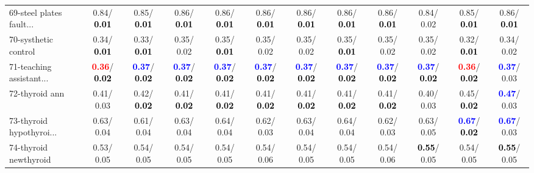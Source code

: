 \begin{table}[h]
\begin{center}
{\begin{tabular}{lc|c|c|c|c|c|c|c|c|c|c}
69-steel plates fault... &   0.84/\textcolor{black}{\textbf{  0.01}} &   0.85/\textcolor{black}{\textbf{  0.01}} &   0.86/\textcolor{black}{\textbf{  0.01}} &   0.86/\textcolor{black}{\textbf{  0.01}} &   0.86/\textcolor{black}{\textbf{  0.01}} &   0.86/\textcolor{black}{\textbf{  0.01}} &   0.86/\textcolor{black}{\textbf{  0.01}} &   0.86/\textcolor{black}{\textbf{  0.01}} &   0.84/  0.02 &   0.85/\textcolor{black}{\textbf{  0.01}} &   0.86/\textcolor{black}{\textbf{  0.01}} \\
70-systhetic control &   0.34/\textcolor{black}{\textbf{  0.01}} &   0.33/\textcolor{black}{\textbf{  0.01}} &   0.35/  0.02 &   0.35/\textcolor{black}{\textbf{  0.01}} &   0.35/  0.02 &   0.35/  0.02 &   0.35/\textcolor{black}{\textbf{  0.01}} &   0.35/  0.02 &   0.35/  0.02 &   0.32/\textcolor{black}{\textbf{  0.01}} &   0.34/  0.02 \\
71-teaching assistant... & \textcolor{red}{\textbf{  0.36}}/\textcolor{black}{\textbf{  0.02}} & \textcolor{blue}{\textbf{  0.37}}/\textcolor{black}{\textbf{  0.02}} & \textcolor{blue}{\textbf{  0.37}}/\textcolor{black}{\textbf{  0.02}} & \textcolor{blue}{\textbf{  0.37}}/\textcolor{black}{\textbf{  0.02}} & \textcolor{blue}{\textbf{  0.37}}/\textcolor{black}{\textbf{  0.02}} & \textcolor{blue}{\textbf{  0.37}}/\textcolor{black}{\textbf{  0.02}} & \textcolor{blue}{\textbf{  0.37}}/\textcolor{black}{\textbf{  0.02}} & \textcolor{blue}{\textbf{  0.37}}/\textcolor{black}{\textbf{  0.02}} & \textcolor{blue}{\textbf{  0.37}}/\textcolor{black}{\textbf{  0.02}} & \textcolor{red}{\textbf{  0.36}}/\textcolor{black}{\textbf{  0.02}} & \textcolor{blue}{\textbf{  0.37}}/  0.03 \\ \hline
72-thyroid ann &   0.41/  0.03 &   0.42/\textcolor{black}{\textbf{  0.02}} &   0.41/\textcolor{black}{\textbf{  0.02}} &   0.41/\textcolor{black}{\textbf{  0.02}} &   0.41/\textcolor{black}{\textbf{  0.02}} &   0.41/\textcolor{black}{\textbf{  0.02}} &   0.41/\textcolor{black}{\textbf{  0.02}} &   0.41/\textcolor{black}{\textbf{  0.02}} &   0.40/  0.03 &   0.45/\textcolor{black}{\textbf{  0.02}} & \textcolor{blue}{\textbf{  0.47}}/  0.03 \\
73-thyroid hypothyroi... &   0.63/  0.04 &   0.61/  0.04 &   0.63/  0.04 &   0.64/  0.04 &   0.62/  0.03 &   0.63/  0.04 &   0.64/  0.04 &   0.62/  0.03 &   0.63/  0.05 & \textcolor{blue}{\textbf{  0.67}}/\textcolor{black}{\textbf{  0.02}} & \textcolor{blue}{\textbf{  0.67}}/  0.03 \\
74-thyroid newthyroid &   0.53/  0.05 &   0.54/  0.05 &   0.54/  0.05 &   0.54/  0.05 &   0.54/  0.06 &   0.54/  0.05 &   0.54/  0.05 &   0.54/  0.06 & \textcolor{black}{\textbf{  0.55}}/  0.05 &   0.54/  0.05 & \textcolor{black}{\textbf{  0.55}}/  0.05 \\

\end{tabular}}
\end{center}
\end{table}
